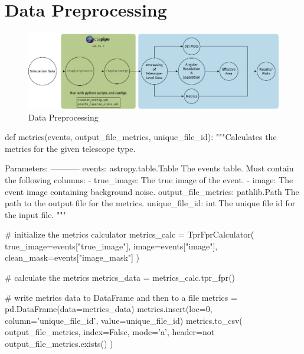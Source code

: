 \chapter{Data Preprocessing}
\label{ch:data-preprocessing}

\begin{figure}
    \centering
    \includegraphics[width=\textwidth]{graphics/data_pipeline.pdf}
    \caption{Data Preprocessing}
    \label{fig:data-preprocessing}
\end{figure}

\begin{minipage}{\textwidth}
  \begin{mdframed}[backgroundcolor=white!20!black,leftmargin=0cm,rightmargin=0cm, skipabove=0pt, innerleftmargin=0,innerrightmargin=0,]
  \begin{pythonlst}
    def metrics(events, output_file_metrics, unique_file_id):
        """Calculates the metrics for the given telescope type.

        Parameters:
        -----------
        events: astropy.table.Table
            The events table. Must contain the following columns:
            - true_image: The true image of the event.
            - image: The event image containing background noise.
        output_file_metrics: pathlib.Path
            The path to the output file for the metrics.
        unique_file_id: int
            The unique file id for the input file.
        """

        # initialize the metrics calculator
        metrics_calc = TprFprCalculator(
            true_image=events["true_image"],
            image=events["image"],
            clean_mask=events["image_mask"]
        )

        # calculate the metrics
        metrics_data = metrics_calc.tpr_fpr()

        # write metrics data to DataFrame and then to a file
        metrics = pd.DataFrame(data=metrics_data)
        metrics.insert(loc=0, column='unique_file_id', value=unique_file_id)
        metrics.to_csv(
            output_file_metrics,
            index=False,
            mode='a',
            header=not output_file_metrics.exists()
        )
  \end{pythonlst}
  \end{mdframed}
\end{minipage}


